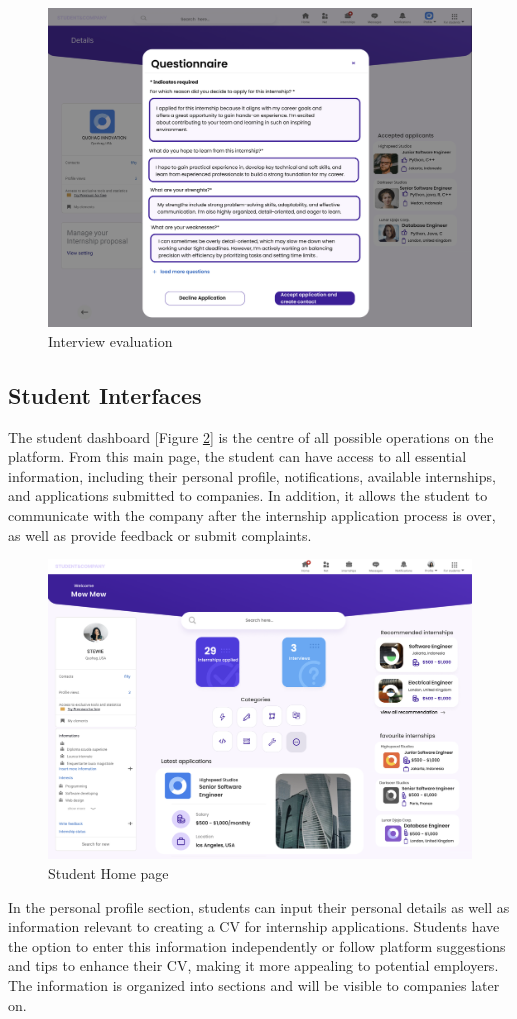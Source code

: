 \begin{figure} [H]
    \centering
    \includegraphics[width=0.5\linewidth]{Images/Interface Images/company interface/Screenshot 2024-12-12 045902.png}
    \caption{Interview evaluation}
    \label{fig:Interviews evaluation}
\end{figure}


\subsection{Student Interfaces}

The student dashboard [Figure \ref{fig:Student Home page}] is the centre of all possible operations on the platform. From this main page, the student can have access to all essential information,
including their personal profile, notifications, available internships, and applications submitted to companies. In addition, it allows the student to communicate with the company after the internship application process is over, as well as provide feedback or submit complaints.

\begin{figure} [H]
    \centering
    \includegraphics[width=0.5\linewidth]{Images/Interface Images/student interface/Screenshot 2024-12-12 045307.png}
    \caption{Student Home page}
    \label{fig:Student Home page}
\end{figure}

In the personal profile section, students can input their personal details as well as information relevant to creating a CV for internship applications. Students have the option to enter this information independently or follow platform suggestions and tips to enhance their CV, making it more appealing to potential employers. The information is organized into sections and will be visible to companies later on.

